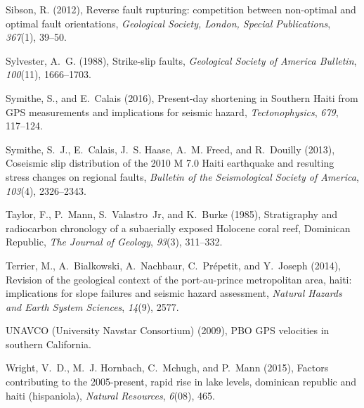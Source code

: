 \documentclass[linenumbers,draft]{agujournal}
\providecommand{\DIFaddbegin}{} %
\begin{document}
\begin{thebibliography}{62}
Sibson, R. (2012), Reverse fault rupturing: competition between non-optimal and
  optimal fault orientations, \textit{Geological Society, London, Special
  Publications}, \textit{367}(1), 39--50.

Sylvester, A.~G. (1988), Strike-slip faults, \textit{Geological Society of
  America Bulletin}, \textit{100}(11), 1666--1703.

Symithe, S., and E.~Calais (2016), {Present-day shortening in Southern Haiti
  from GPS measurements and implications for seismic hazard},
  \textit{Tectonophysics}, \textit{679}, 117--124.

Symithe, S.~J., E.~Calais, J.~S. Haase, A.~M. Freed, and R.~Douilly (2013),
  {Coseismic slip distribution of the 2010 M 7.0 Haiti earthquake and resulting
  stress changes on regional faults}, \textit{Bulletin of the Seismological
  Society of America}, \textit{103}(4), 2326--2343.

Taylor, F., P.~Mann, S.~Valastro~Jr, and K.~Burke (1985), Stratigraphy and
  radiocarbon chronology of a subaerially exposed {Holocene coral reef,
  Dominican Republic}, \textit{The Journal of Geology}, \textit{93}(3),
  311--332.

Terrier, M., A.~Bialkowski, A.~Nachbaur, C.~Pr{\'e}petit, and Y.~Joseph (2014),
  Revision of the geological context of the port-au-prince metropolitan area,
  haiti: implications for slope failures and seismic hazard assessment,
  \textit{Natural Hazards and Earth System Sciences}, \textit{14}(9), 2577.

{UNAVCO (University Navstar Consortium)} (2009), {PBO GPS velocities in
  southern California}.

Wright, V.~D., M.~J. Hornbach, C.~Mchugh, and P.~Mann (2015), Factors
  contributing to the 2005-present, rapid rise in lake levels, dominican
  republic and haiti (hispaniola), \textit{Natural Resources}, \textit{6}(08),
  465.

\end{thebibliography}
\DIFaddbegin 
\end{document}
